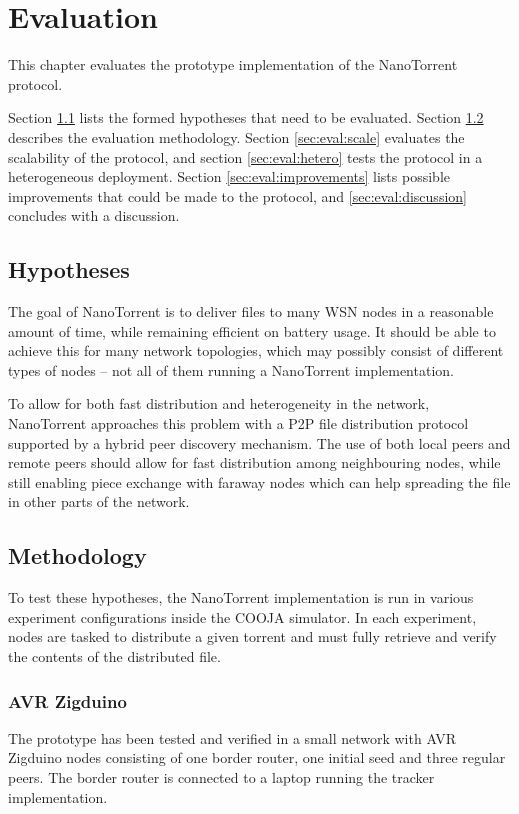 \chapter{Evaluation}
\label{cha:evaluation}
This chapter evaluates the prototype implementation of the NanoTorrent protocol.

Section \ref{sec:eval:hypotheses} lists the formed hypotheses that need to be evaluated. Section \ref{sec:eval:method} describes the evaluation methodology. Section \ref{sec:eval:scale} evaluates the scalability of the protocol, and section \ref{sec:eval:hetero} tests the protocol in a heterogeneous deployment. Section \ref{sec:eval:improvements} lists possible improvements that could be made to the protocol, and \ref{sec:eval:discussion} concludes with a discussion.

\section{Hypotheses}
\label{sec:eval:hypotheses}
The goal of NanoTorrent is to deliver files to many \gls{WSN} nodes in a reasonable amount of time, while remaining efficient on battery usage. It should be able to achieve this for many network topologies, which may possibly consist of different types of nodes -- not all of them running a NanoTorrent implementation.

To allow for both fast distribution and heterogeneity in the network, NanoTorrent approaches this problem with a \gls{P2P} file distribution protocol supported by a hybrid peer discovery mechanism. The use of both local peers and remote peers should allow for fast distribution among neighbouring nodes, while still enabling piece exchange with faraway nodes which can help spreading the file in other parts of the network.

\section{Methodology}
\label{sec:eval:method}
To test these hypotheses, the NanoTorrent implementation is run in various experiment configurations inside the COOJA simulator. In each experiment, nodes are tasked to distribute a given torrent and must fully retrieve and verify the contents of the distributed file.

\subsection{AVR Zigduino}
The prototype has been tested and verified in a small network with AVR Zigduino nodes consisting of one border router, one initial seed and three regular peers. The border router is connected to a laptop running the tracker implementation.

